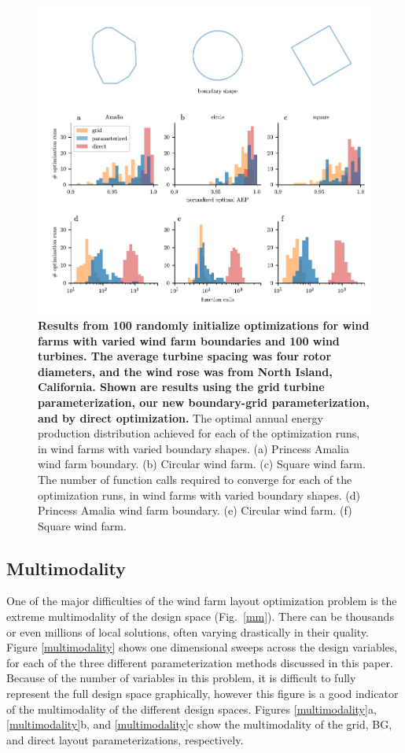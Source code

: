 \documentclass[wes, manuscript]{copernicus}
\begin{document}
\begin{figure}
\centering
\includegraphics{paper-figures/results_bounds.pdf}
\caption{\textbf{Results from 100 randomly initialize optimizations for wind farms with varied wind farm boundaries and 100 wind turbines. The average turbine spacing was four rotor diameters, and the wind rose was from North Island, California. Shown are results using the grid turbine parameterization, our new boundary-grid parameterization, and by direct optimization.} The optimal annual energy production distribution achieved for each of the optimization runs, in wind farms with varied boundary shapes.  (a) Princess Amalia wind farm boundary. (b) Circular wind farm. (c) Square wind farm. The number of function calls required to converge for each of the optimization runs, in wind farms with varied boundary shapes.  (d) Princess Amalia wind farm boundary. (e) Circular wind farm. (f) Square wind farm. }
\label{results-bounds}
\end{figure}


\subsection{Multimodality}

One of the major difficulties of the wind farm layout optimization problem is the extreme multimodality of the design space (Fig.~\ref{mm}). There can be thousands or even millions of local solutions, often varying drastically in their quality. Figure \ref{multimodality} shows one dimensional sweeps across the design variables, for each of the three different parameterization methods discussed in this paper. Because of the number of variables in this problem, it is difficult to fully represent the full design space graphically, however this figure is a good indicator of the multimodality of the different design spaces. Figures \ref{multimodality}a, \ref{multimodality}b, and \ref{multimodality}c show the multimodality of the grid, BG, and direct layout parameterizations, respectively. 
\end{document}
